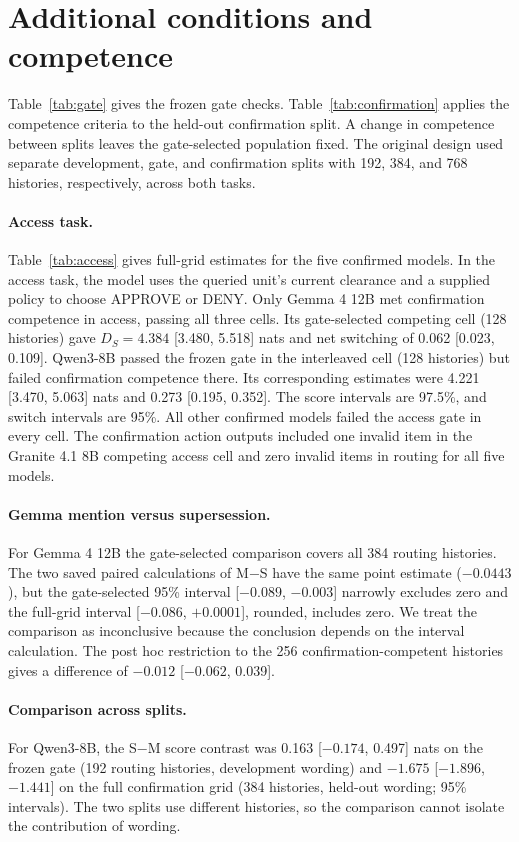 \section{Additional conditions and competence}
Table~\ref{tab:gate} gives the frozen gate checks. Table~\ref{tab:confirmation} applies the competence criteria to the held-out confirmation split. A change in competence between splits leaves the gate-selected population fixed. The original design used separate development, gate, and confirmation splits with 192, 384, and 768 histories, respectively, across both tasks.



\paragraph{Access task.}
Table~\ref{tab:access} gives full-grid estimates for the five confirmed models. In the access task, the model uses the queried unit's current clearance and a supplied policy to choose APPROVE or DENY. Only Gemma 4 12B met confirmation competence in access, passing all three cells. Its gate-selected competing cell (128 histories) gave $D_S=4.384$ [3.480, 5.518] nats and net switching of 0.062 [0.023, 0.109]. Qwen3-8B passed the frozen gate in the interleaved cell (128 histories) but failed confirmation competence there. Its corresponding estimates were 4.221 [3.470, 5.063] nats and 0.273 [0.195, 0.352]. The score intervals are 97.5\%, and switch intervals are 95\%. All other confirmed models failed the access gate in every cell. The confirmation action outputs included one invalid item in the Granite 4.1 8B competing access cell and zero invalid items in routing for all five models.

\paragraph{Gemma mention versus supersession.}
For Gemma 4 12B the gate-selected comparison covers all 384 routing histories. The two saved paired calculations of M$-$S have the same point estimate ($-0.0443$), but the gate-selected 95\% interval [$-0.089$, $-0.003$] narrowly excludes zero and the full-grid interval [$-0.086$, $+0.0001$], rounded, includes zero. We treat the comparison as inconclusive because the conclusion depends on the interval calculation. The post hoc restriction to the 256 confirmation-competent histories gives a difference of $-0.012$ [$-0.062$, 0.039].

\paragraph{Comparison across splits.}
For Qwen3-8B, the S$-$M score contrast was 0.163 [$-0.174$, 0.497] nats on the frozen gate (192 routing histories, development wording) and $-1.675$ [$-1.896$, $-1.441$] on the full confirmation grid (384 histories, held-out wording; 95\% intervals). The two splits use different histories, so the comparison cannot isolate the contribution of wording.

